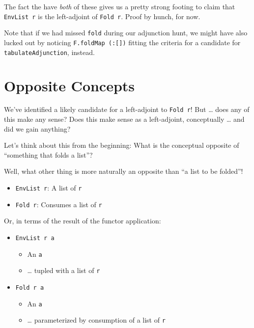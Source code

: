 \documentclass[]{article}
\begin{document}
The fact the have \emph{both} of these gives us a pretty strong footing to claim
that \texttt{EnvList\ r} is the left-adjoint of \texttt{Fold\ r}. Proof by
hunch, for now.

Note that if we had missed \texttt{fold} during our adjunction hunt, we might
have also lucked out by noticing \texttt{F.foldMap\ (:{[}{]})} fitting the
criteria for a candidate for \texttt{tabulateAdjunction}, instead.

\section{Opposite Concepts}\label{opposite-concepts}

We've identified a likely candidate for a left-adjoint to \texttt{Fold\ r}! But
\ldots{} does any of this make any sense? Does this make sense as a
left-adjoint, conceptually \ldots{} and did we gain anything?

Let's think about this from the beginning: What is the conceptual opposite of
``something that folds a list''?

Well, what other thing is more naturally an opposite than ``a list to be
folded''!

\begin{itemize}
\tightlist
\item
  \texttt{EnvList\ r}: A list of \texttt{r}
\item
  \texttt{Fold\ r}: Consumes a list of \texttt{r}
\end{itemize}

Or, in terms of the result of the functor application:

\begin{itemize}
\tightlist
\item
  \texttt{EnvList\ r\ a}

  \begin{itemize}
  \tightlist
  \item
    An \texttt{a}
  \item
    \ldots{} tupled with a list of \texttt{r}
  \end{itemize}
\item
  \texttt{Fold\ r\ a}

  \begin{itemize}
  \tightlist
  \item
    An \texttt{a}
  \item
    \ldots{} parameterized by consumption of a list of \texttt{r}
  \end{itemize}
\end{itemize}
\end{document}
